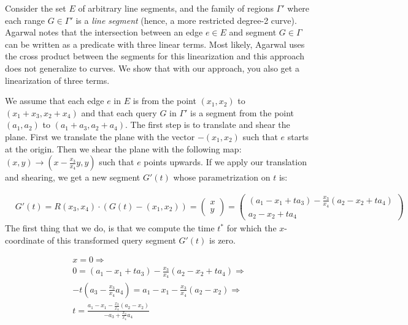 \documentclass[UKenglish]{lipics-v2019}
\begin{document}
Consider the set $E$ of arbitrary line segments, and the family of regions $\Gamma'$ where each range $G \in \Gamma'$ is a \emph{line segment} (hence, a more restricted degree-2 curve). Agarwal notes \cite{agarwal1996range} that the intersection between an edge $e \in E$ and segment $G \in \Gamma$ can be written as a predicate with three linear terms. Most likely, Agarwal uses the cross product between the segments for this linearization and this approach does not generalize to curves. We show that with our approach, you also get a linearization of three terms. 

We assume that each edge $e$ in $E$ is from the point $(x_1, x_2)$ to $(x_1 + x_3, x_2 + x_4)$ and that each query $G$ in $\Gamma'$ is a segment from the point $(a_1, a_2)$ to $(a_1 + a_3, a_2 + a_4)$. The first step is to translate and shear the plane.
First we translate the plane with the vector $-(x_1, x_2)$ such that $e$ starts at the origin. Then we shear the plane with the following map: $(x,y) \rightarrow (x - \frac{x_3}{x_4}y, y)$ such that $e$ points upwards. 
If we apply our translation and shearing, we get a new segment $G'(t)$ whose parametrization on $t$ is:

\begin{align*}
    &G'(t) = R(x_3, x_4) \cdot (G(t) - (x_1, x_2)) =  
    \left( \begin{array}{c}
         x  \\
         y 
    \end{array} \right) =
    \left( \begin{array}{c}
         (a_1 - x_1 + t a_3) - \frac{x_3}{x_4}(a_2 - x_2 + t a_4 )  \\
         a_2 - x_2 + t a_4 
    \end{array} \right)
\end{align*}
The first thing that we do, is that we compute the time $t^*$ for which the $x$-coordinate of this transformed query segment $G'(t)$ is zero.

\begin{align*}
    x = 0 \Rightarrow \\
    0 = (a_1 - x_1 + t a_3) - \frac{x_3}{x_4}(a_2 - x_2 + t a_4 )   \Rightarrow \\
    - t ( a_3 -  \frac{x_3}{x_4} a_4) = a_1 - x_1 - \frac{x_3}{x_4} (a_2 - x_2) \Rightarrow \\
    t = \frac{   a_1 - x_1 - \frac{x_3}{x_4} (a_2 - x_2)}{ - a_3 + \frac{x_3}{x_4}a_4}
\end{align*}
\end{document}
